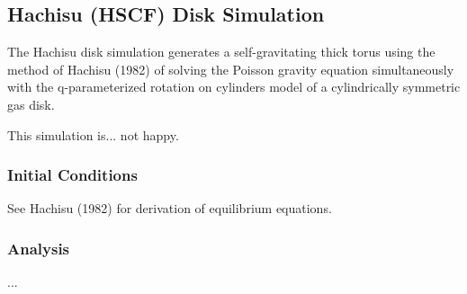 
\subsection{Hachisu (HSCF) Disk Simulation}

The Hachisu disk simulation generates a self-gravitating thick torus using the
method of Hachisu (1982) of solving the Poisson gravity equation simultaneously
with the q-parameterized rotation on cylinders model of a cylindrically symmetric gas disk.

This simulation is... not happy.

\subsubsection{Initial Conditions}

See Hachisu (1982) for derivation of equilibrium equations.

\subsubsection{Analysis}

...
